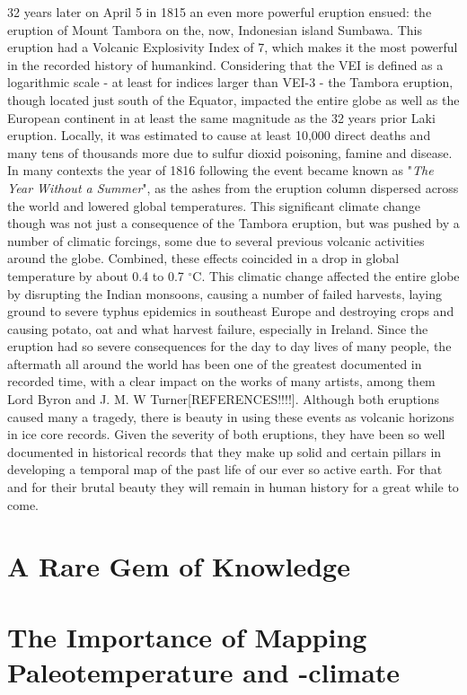 \documentclass[../../CompleteThesis/Complete_1stDraft]{subfiles}
\begin{document}
32 years later on April 5 in 1815 an even more powerful eruption ensued: the eruption of Mount Tambora on the, now, Indonesian island Sumbawa. This eruption had a Volcanic Explosivity Index of 7, which makes it the most powerful in the recorded history of humankind. Considering that the VEI is defined as a logarithmic scale - at least for indices larger than VEI-3 - the Tambora eruption, though located just south of the Equator, impacted the entire globe as well as the European continent in at least the same magnitude as the 32 years prior Laki eruption. Locally, it was estimated to cause at least 10,000 direct deaths and many tens of thousands more due to sulfur dioxid poisoning, famine and disease. In many contexts the year of 1816 following the event became known as "\textit{The Year Without a Summer}", as the ashes from the eruption column dispersed across the world and lowered global temperatures. This significant climate change though was not just a consequence of the Tambora eruption, but was pushed by a number of climatic forcings, some due to several previous volcanic activities around the globe. Combined, these effects coincided in a drop in global temperature by about 0.4 to 0.7 $^{\circ}$C. This climatic change affected the entire globe by disrupting the Indian monsoons, causing a number of failed harvests, laying ground to severe typhus epidemics in southeast Europe and destroying crops and causing potato, oat and what harvest failure, especially in Ireland. Since the eruption had so severe consequences for the day to day lives of many people, the aftermath all around the world has been one of the greatest documented in recorded time, with a clear impact on the works of many artists, among them Lord Byron and J. M. W Turner[REFERENCES!!!!]. Although both eruptions caused many a tragedy, there is beauty in using these events as volcanic horizons in ice core records. Given the severity of both eruptions, they have been so well documented in historical records that they make up solid and certain pillars in developing a temporal map of the past life of our ever so active earth. For that and for their brutal beauty they will remain in human history for a great while to come.

\section[A Rare Gem]{A Rare Gem of Knowledge}
\section[Paleotemperature and -climate]{The Importance of Mapping Paleotemperature and -climate}
\end{document}
